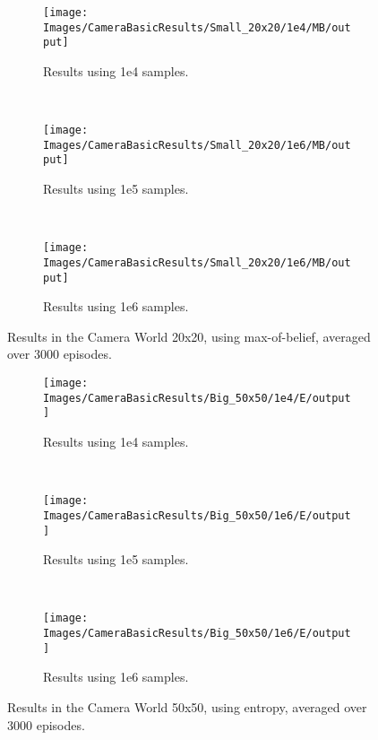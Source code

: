 \begin{figure}[ht]
        \centering
        \begin{subfigure}[t]{0.3\textwidth}
                \texttt{[image: Images/CameraBasicResults/Small\_20x20/1e4/MB/output]}
                \caption{Results using 1e4 samples.}
                \label{fig:cws4mb}
        \end{subfigure}%
        ~ %
        \begin{subfigure}[t]{0.3\textwidth}
                \texttt{[image: Images/CameraBasicResults/Small\_20x20/1e6/MB/output]}
                \caption{Results using 1e5 samples.}
                \label{fig:cws5mb}
        \end{subfigure}
        ~ %
        \begin{subfigure}[t]{0.3\textwidth}
                \texttt{[image: Images/CameraBasicResults/Small\_20x20/1e6/MB/output]}
                \caption{Results using 1e6 samples.}
                \label{fig:cws6mb}
        \end{subfigure}
        \caption{Results in the Camera World 20x20, using max-of-belief, averaged over 3000 episodes.}\label{fig:cwsmb}
\end{figure}

\begin{figure}[ht]
        \centering
        \begin{subfigure}[t]{0.3\textwidth}
                \texttt{[image: Images/CameraBasicResults/Big\_50x50/1e4/E/output]}
                \caption{Results using 1e4 samples.}
                \label{fig:cwb4e}
        \end{subfigure}%
        ~ %
        \begin{subfigure}[t]{0.3\textwidth}
                \texttt{[image: Images/CameraBasicResults/Big\_50x50/1e6/E/output]}
                \caption{Results using 1e5 samples.}
                \label{fig:cwb5e}
        \end{subfigure}
        ~ %
        \begin{subfigure}[t]{0.3\textwidth}
                \texttt{[image: Images/CameraBasicResults/Big\_50x50/1e6/E/output]}
                \caption{Results using 1e6 samples.}
                \label{fig:cwb6e}
        \end{subfigure}
        \caption{Results in the Camera World 50x50, using entropy, averaged over 3000 episodes.}\label{fig:cwbe}
\end{figure}

